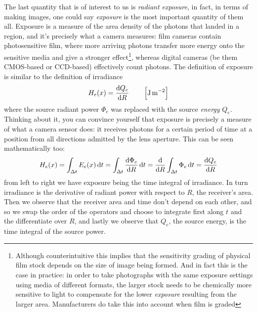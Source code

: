 The last quantity that is of interest to us is \textsl{radiant \gls{exposure}},
in fact, in terms of making images, one could say \emph{exposure} is the most important
quantity of them all. Exposure is a measure of the area density of
the photons that landed in a region, and it's precisely what a camera measures:
film cameras contain photosensitive film, where more arriving photons transfer more
energy onto the sensitive media and give a stronger effect\footnote{
	Although counterintuitive this implies that the sensitivity grading of physical film
	stock depends on the size of image being formed. And in fact this is the case in practice:
	in order to take photographs with the same exposure settings using media of different
	formats, the larger stock needs to be chemically more sensitive to light to compensate
	for the lower \textsl{exposure} resulting from the larger area.
	Manufacturers do take this into account when film is graded
}, whereas digital cameras (be them \gls{CMOS}-based or \gls{CCD}-based) effectively 
count photons. 
The definition of \gls{exposure} is similar to the definition of \gls{irradiance}
\begin{equation}
	H_e(x) = \frac{\d Q_e}{\d R} \qquad \left[\unit{\joule\per\square\meter}\right]
\end{equation}
where the source radiant power $\Phi_e$ was replaced with the source \emph{energy} $Q_e$.
Thinking about it, you can convince yourself that exposure is precisely a measure of what a camera
sensor does: it receives photons for a certain period of time at a position from all directions
admitted by the lens aperture.
This can be seen mathematically too:
\begin{equation}
	H_e(x) = \int_{\Delta t} E_e(x) \d t 
	       = \int_{\Delta t} \frac{\d\Phi_e}{\d R} \d t
	       = \frac{\d}{\d R} \int_{\Delta t} \Phi_e \d t
	       = \frac{\d Q_e }{\d R} 
\end{equation}
from left to right we have exposure being the time integral of irradiance. In turn irradiance
is the derivative of radiant power with respect to $R$, the receiver's area. Then we observe that
the receiver area and time don't depend on each other, and so we swap the order of the operators 
and choose to integrate first along $t$ and the differentiate over $R$, and lastly we observe 
that $Q_e$, the source energy, is the time integral of the source power.


